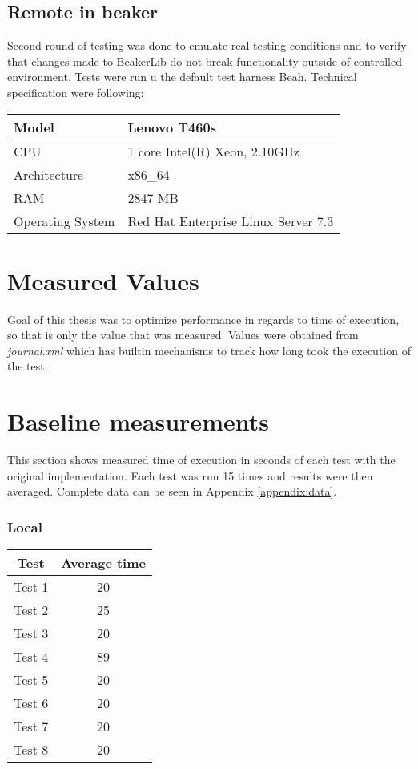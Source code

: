 \subsection{Remote in beaker}
Second round of testing was done to emulate real testing conditions and to verify that changes made to BeakerLib do not break functionality outside of controlled environment. Tests were run u the default test harness Beah. Technical specification were following:

\begin{center}
    \begin{tabular}{| l | l |}
    \hline
    Model & Lenovo T460s \\ \hline
    CPU & 1 core Intel(R) Xeon, 2.10GHz \\ \hline
    Architecture & x86\_64 \\ \hline
    RAM & 2847 MB   \\ \hline
    Operating System & Red Hat Enterprise Linux Server 7.3 \\ \hline
    \end{tabular}
\end{center}


\section{Measured Values} %
Goal of this thesis was to optimize performance in regards to time of execution, so that is only the value that was measured. Values were obtained from \textit{journal.xml} which has builtin mechanisms to track how long took the execution of the test.

\section{Baseline measurements}
This section shows measured time of execution in seconds of each test with the original implementation. Each test was run 15 times and results were then averaged. Complete data can be seen in Appendix \ref{appendix:data}.

\subsubsection{Local}

\begin{center}
    \begin{tabular}{| c | c |}
    \hline
    Test & Average time\\ \hline
    Test 1 & 20 \\ \hline
    Test 2 & 25 \\ \hline
    Test 3 & 20 \\ \hline
    Test 4 & 89 \\ \hline
    Test 5 & 20 \\ \hline
    Test 6 & 20 \\ \hline
    Test 7 & 20 \\ \hline
    Test 8 & 20 \\ \hline
    \end{tabular}
\end{center}

